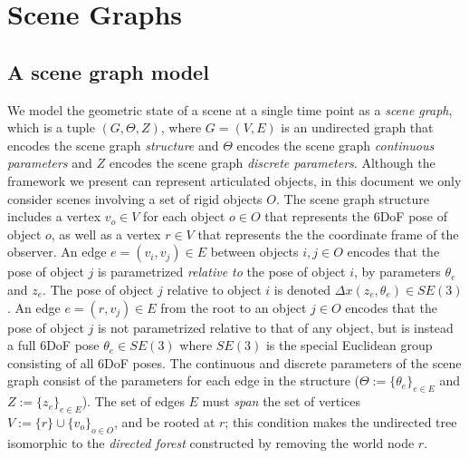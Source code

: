 \chapter{Scene Graphs} \label{chap:2}

\section{A scene graph model}
We model the geometric state of a scene at a single time point as a \emph{scene graph}, which is a tuple $(G, \Theta, Z)$, where $G = (V, E)$ is an undirected graph that encodes the scene graph \emph{structure} and $\Theta$ encodes the scene graph \emph{continuous parameters} and $Z$ encodes the scene graph \emph{discrete parameters}.
Although the framework we present can represent articulated objects, in this document we only consider scenes involving a set of rigid objects $O$.
The scene graph structure includes a vertex $v_o \in V$ for each object $o \in O$ that represents the 6DoF pose of object $o$, as well as a vertex $r \in V$ that represents the the coordinate frame of the observer.
An edge $e = (v_i, v_j) \in E$ between objects $i, j \in O$ encodes that the pose of object $j$ is parametrized \emph{relative to} the pose of object $i$, by parameters $\theta_e$ and $z_e$.
The pose of object $j$ relative to object $i$ is denoted $\Delta x(z_e, \theta_e) \in SE(3)$.
An edge $e = (r, v_j) \in E$ from the root to an object $j \in O$ encodes that the pose of object $j$ is not parametrized relative to that of any object, but is instead a full 6DoF pose $\theta_e \in SE(3)$ where $SE(3)$ is the special Euclidean group consisting of all 6DoF poses.
The continuous and discrete parameters of the scene graph consist of the parameters for each edge in the structure ($\Theta := \{\theta_e\}_{e \in E}$ and $Z := \{z_e\}_{e \in E}$).
The set of edges $E$ must \emph{span} the set of vertices $V := \{r\} \cup \{v_o\}_{o \in O}$, and be rooted at $r$; this condition makes the undirected tree isomorphic to the \textit{directed forest} constructed by removing the world node $r$.

